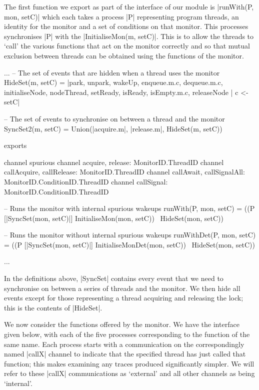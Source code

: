 The first function we export as part of the interface of our module is |runWith(P, mon, setC)| which each takes a process |P| representing program threads, an identity for the monitor and a set of conditions on that monitor. This processes synchronises |P| with the |InitialiseMon(m, setC)|. This is to allow the threads to `call' the various functions that act on the monitor correctly and so that mutual exclusion between threads can be obtained using the functions of the monitor. 

\begin{cspm}
  ...
  -- The set of events that are hidden when a thread uses the monitor
  HideSet(m, setC) = 
    {|park, unpark, wakeUp, enqueue.m.c, dequeue.m.c, initialiseNode, nodeThread,
      setReady, isReady, isEmpty.m.c, releaseNode | c <- setC|}

  -- The set of events to synchronise on between a thread and the monitor
    SyncSet2(m, setC) = Union({{|acquire.m|}, {|release.m|}, HideSet(m, setC)})

exports

  channel spurious
  channel acquire, release: MonitorID.ThreadID
  channel callAcquire, callRelease: MonitorID.ThreadID
  channel callAwait, callSignalAll: MonitorID.ConditionID.ThreadID
  channel callSignal: MonitorID.ConditionID.ThreadID

  -- Runs the monitor with internal spurious wakeups
  runWith(P, mon, setC) = 
    ((P [|SyncSet(mon, setC)|] 
          InitialiseMon(mon, setC)) \ HideSet(mon, setC))

  -- Runs the monitor without internal spurious wakeups
  runWithDet(P, mon, setC) = 
    ((P [|SyncSet(mon, setC)|] 
          InitialiseMonDet(mon, setC)) \  HideSet(mon, setC))

  ...
\end{cspm}

In the definitions above, |SyncSet| contains every event that we need to synchronise on between a series of threads and the monitor. We then hide all events except for those representing a thread acquiring and releasing the lock; this is the contents of |HideSet|.

We now consider the functions offered by the monitor. We have the interface given below, with each of the five processes corresponding to the function of the same name. Each process starts with a communication on the correspondingly named |callX| channel to indicate that the specified thread has just called that function; this makes examining any traces produced significantly simpler. We will refer to these |callX| communications as `external' and all other channels as being `internal'. 
  
